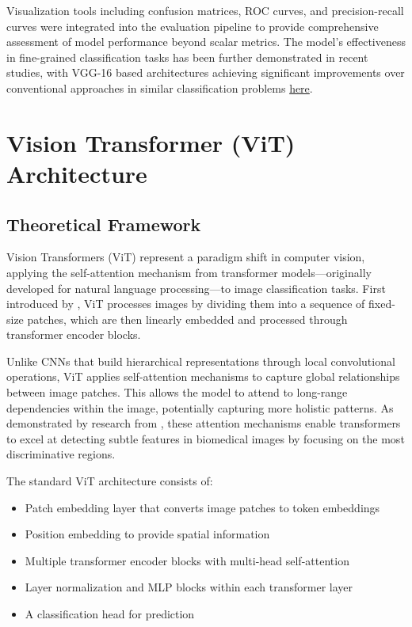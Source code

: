\documentclass[a4paper,12pt]{article}
\begin{document}
Visualization tools including confusion matrices, ROC curves, and precision-recall curves were integrated into the evaluation pipeline to provide comprehensive assessment of model performance beyond scalar metrics. The model's effectiveness in fine-grained classification tasks has been further demonstrated in recent studies, with VGG-16 based architectures achieving significant improvements over conventional approaches in similar classification problems \href{https://ieeexplore.ieee.org/stamp/stamp.jsp?tp=&arnumber=10648677&tag=1}{here}.




\section{Vision Transformer (ViT) Architecture}

\subsection{Theoretical Framework}

Vision Transformers (ViT) represent a paradigm shift in computer vision, applying the self-attention mechanism from transformer models—originally developed for natural language processing—to image classification tasks. First introduced by \citep{dosovitskiy2020image}, ViT processes images by dividing them into a sequence of fixed-size patches, which are then linearly embedded and processed through transformer encoder blocks.

Unlike CNNs that build hierarchical representations through local convolutional operations, ViT applies self-attention mechanisms to capture global relationships between image patches. This allows the model to attend to long-range dependencies within the image, potentially capturing more holistic patterns. As demonstrated by research from \citep{liu2022attention}, these attention mechanisms enable transformers to excel at detecting subtle features in biomedical images by focusing on the most discriminative regions.

The standard ViT architecture consists of:

\begin{itemize}
    \item Patch embedding layer that converts image patches to token embeddings
    \item Position embedding to provide spatial information
    \item Multiple transformer encoder blocks with multi-head self-attention
    \item Layer normalization and MLP blocks within each transformer layer
    \item A classification head for prediction
\end{itemize}
\end{document}
